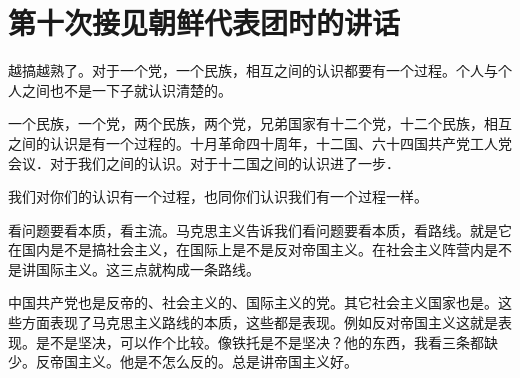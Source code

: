 \section[第十次接见朝鲜代表团时的讲话（一九五八年十一月二十五日）]{第十次接见朝鲜代表团时的讲话}


越搞越熟了。对于一个党，一个民族，相互之间的认识都要有一个过程。个人与个人之间也不是一下子就认识清楚的。

一个民族，一个党，两个民族，两个党，兄弟国家有十二个党，十二个民族，相互之间的认识是有一个过程的。十月革命四十周年，十二国、六十四国共产党工人党会议．对于我们之间的认识。对于十二国之间的认识进了一步．

我们对你们的认识有一个过程，也同你们认识我们有一个过程一样。

看问题要看本质，看主流。马克思主义告诉我们看问题要看本质，看路线。就是它在国内是不是搞社会主义，在国际上是不是反对帝国主义。在社会主义阵营内是不是讲国际主义。这三点就构成一条路线。

中国共产党也是反帝的、社会主义的、国际主义的党。其它社会主义国家也是。这些方面表现了马克思主义路线的本质，这些都是表现。例如反对帝国主义这就是表现。是不是坚决，可以作个比较。像铁托是不是坚决？他的东西，我看三条都缺少。反帝国主义。他是不怎么反的。总是讲帝国主义好。


